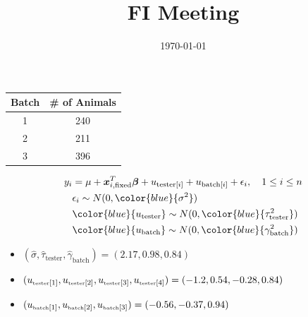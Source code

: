 \documentclass[8pt]{beamer}
\title{FI Meeting}
\date{\today}
\begin{document}
\maketitle


\begin{frame}
\begin{table}
\centering
\begin{tabular}{|c|c|}
\hline
Batch & \# of Animals \\
\hline
1 & 240  \\ 
2 & 211 \\
3 & 396 \\ 
\hline

\end{tabular}
\end{table}

\begin{eqnarray*}
y_{i} & = \mu + \bm{x}_{i, \text{fixed}}^T\bm{\beta} + u_{\text{tester}[i]} + u_{\text{batch}[i]} + \epsilon_i, \quad 1 \le i \le n \\ 
& \epsilon_i \sim N(0, {\color{blue}{\sigma^2}}) \\ 
& {\color{blue}{u_{\text{tester}}}} \sim N(0, {\color{blue}{\tau_{\text{tester}}^2}}) \\
& {\color{blue}{u_{\text{batch}}}} \sim N(0, {\color{blue}{\gamma_{\text{batch}}^2}}) \\
\end{eqnarray*}

\begin{itemize}
    \item $(\hat\sigma, \hat\tau_{\text{tester}}, \hat\gamma_{\text{batch}}) =  (2.17,0.98,0.84)$

    \item $(u_{\tiny{\mbox{tester}[1]}}, u_{\tiny{\mbox{tester}[2]}}, u_{\tiny{\mbox{tester}[3]}}, u_{\tiny{\mbox{tester}[4]}}) = (-1.2, 0.54, -0.28,0.84)$

    \item $(u_{\tiny\mbox{batch}[1]}, u_{\tiny\mbox{batch}[2]}, u_{\tiny\mbox{batch}[3]}) = (-0.56, -0.37, 0.94)$
\end{itemize}
\end{frame}
\end{document}
